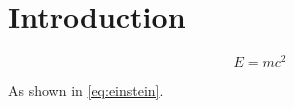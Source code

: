 \section{Introduction}
\begin{equation}
E = mc^2
\label{eq:einstein}
\end{equation}

As shown in \eqref{eq:einstein}.
